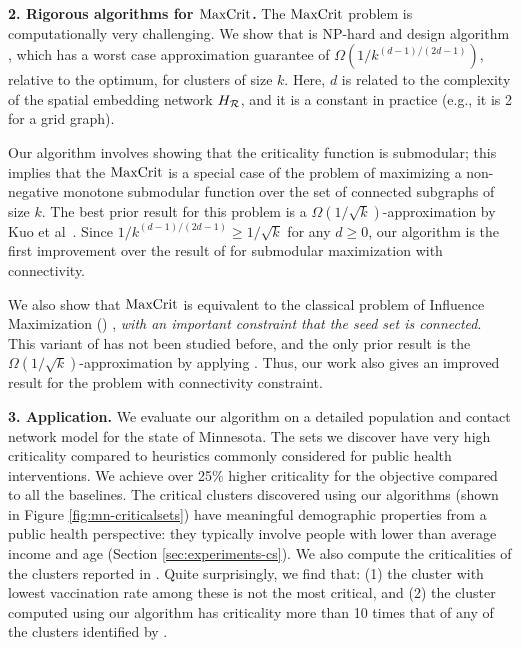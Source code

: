 \noindent
\textbf{2. Rigorous algorithms for $\text{MaxCrit}{}$.}
The $\text{MaxCrit}{}$ problem is computationally very challenging. We show that \maxcrit{} is NP-hard and design algorithm \algomaxcrit{}, which has a worst case approximation guarantee of $\Omega(1/k^{(d-1)/(2d-1)})$, relative to the optimum, for clusters of size $k$. Here, $d$ is related to the complexity of the spatial embedding network $H_{\mathcal{R}}$, and it is a constant in practice
(e.g., it is 2 for a grid graph).

Our algorithm involves showing that the criticality function is submodular; this implies that the $\text{MaxCrit}{}$ is a special case
of the problem of maximizing a non-negative monotone submodular function over the set of connected subgraphs of size $k$.
The best prior result for this problem is a $\Omega(1/\sqrt{k})$-approximation by Kuo et al~\cite{kuo2015maximizing}.
Since $1/k^{(d-1)/(2d-1)}\geq 1/\sqrt{k}$ for any $d\geq0$, our algorithm is the first improvement over the
result of \cite{kuo2015maximizing} for submodular maximization with connectivity.

We also show that $\text{MaxCrit}{}$ is equivalent to the classical problem of Influence Maximization (\infmax) \cite{kempe:sigkdd03},
\emph{with an important constraint that the seed set is connected}. This variant of \infmax{} has not been studied before,
and the only prior result is the $\Omega(1/\sqrt{k})$-approximation by applying \cite{kuo2015maximizing}.
Thus, our work also gives an improved result for the \infmax{} problem with connectivity constraint.



\noindent
\textbf{3. Application.} 
We evaluate our algorithm on a detailed population and contact network model for the state of Minnesota.
The sets we discover have very high criticality compared to
heuristics commonly considered for public health interventions.
We achieve over 25\% higher criticality for the objective compared to all the baselines.
The critical clusters discovered using our algorithms (shown in Figure \ref{fig:mn-criticalsets})
have meaningful demographic properties
from a public health perspective: they typically involve people with lower than average
income and age (Section \ref{sec:experiments-cs}).
We also compute the criticalities of the clusters reported in \cite{cadena:vacc-cluster}.
Quite surprisingly, we find that: (1) the cluster with lowest vaccination rate among these is not the most critical, and
(2) the cluster computed using our algorithm has criticality more than 10 times that of any of the clusters
identified by \cite{cadena:vacc-cluster}.


